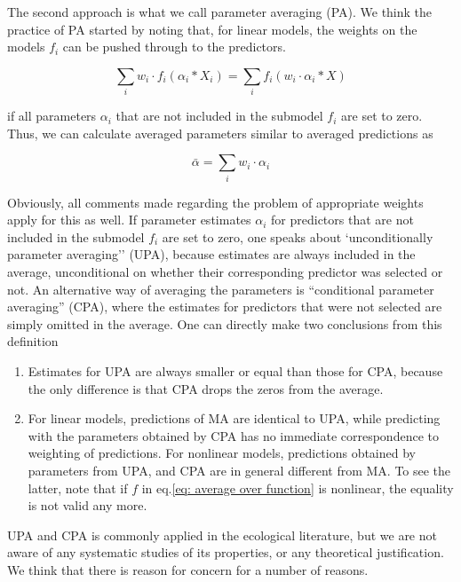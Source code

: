 \documentclass[5p]{elsarticle}
\begin{document}
The second approach is what we call parameter averaging (PA). We think the practice of PA started by noting that, for linear models, the weights on the models $f_i$ can be pushed through to the predictors. 

\begin{equation}
 \sum_i w_i \cdot  f_i(\alpha_i * X_i) = \sum_i f_i(w_i \cdot \alpha_i * X)
\label{eq: motivation parameter averaging}
\end{equation}

if all parameters $\alpha_i$ that are not included in the submodel $f_i$ are set to zero. Thus, we can calculate averaged parameters similar to averaged predictions as

\begin{equation}
 \bar{\alpha} = \sum_i w_i \cdot \alpha_i 
\label{eq: averaged parameters }
\end{equation}

Obviously, all comments made regarding the problem of appropriate weights apply for this as well. If parameter estimates $\alpha_i$ for predictors that are not included in the submodel $f_i$ are set to zero, one speaks about `unconditionally parameter averaging'' (UPA), because estimates are always included in the average, unconditional on whether their corresponding predictor was selected or not. An alternative way of averaging the parameters is ``conditional parameter averaging'' (CPA), where the estimates for predictors that were not selected are simply omitted in the average. One can directly make two conclusions from this definition 

\begin{enumerate}
\item Estimates for UPA are always smaller or equal than those for CPA, because the only difference is that CPA drops the zeros from the average. 
\item For linear models, predictions of MA are identical to UPA, while predicting with the parameters obtained by CPA has no immediate correspondence to weighting of predictions. For nonlinear models, predictions obtained by parameters from UPA, and CPA are in general different from MA. To see the latter, note that if $f$ in eq.\ref{eq: average over function} is nonlinear, the equality is not valid any more.
\end{enumerate}

UPA and CPA is commonly applied in the ecological literature, but we are not aware of any systematic studies of its properties, or any theoretical justification. We think that there is reason for concern for a number of reasons. 
\end{document}
